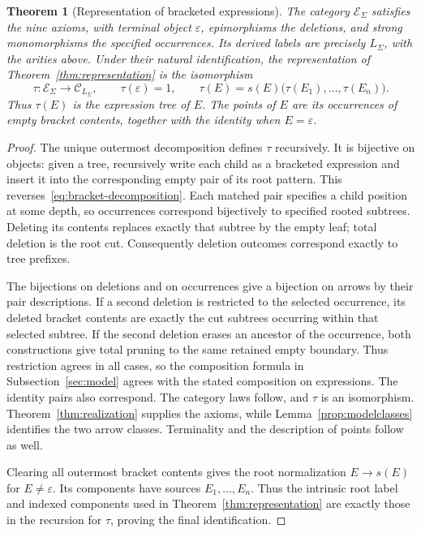 \documentclass[11pt,a4paper]{article}
\theoremstyle{plain}
\newtheorem{theorem}{Theorem}[section]
\theoremstyle{definition}
\theoremstyle{remark}
\newcommand{\C}{\mathcal C}
\begin{document}
\begin{theorem}[Representation of bracketed expressions]\label{prop:bracketed}
The category $\mathcal E_\Sigma$ satisfies the nine axioms, with
terminal object $\varepsilon$, epimorphisms the deletions, and strong
monomorphisms the specified occurrences. Its derived labels are
precisely $L_\Sigma$, with the arities above. Under their natural
identification, the representation of Theorem~\ref{thm:representation}
is the isomorphism
\[
 \tau:\mathcal E_\Sigma\longrightarrow\C_{L_\Sigma},
 \qquad
 \tau(\varepsilon)=1,\qquad
 \tau(E)=s(E)\bigl(\tau(E_1),\ldots,\tau(E_n)\bigr).
\]
Thus $\tau(E)$ is the expression tree of $E$. The points of $E$ are
its occurrences of empty bracket contents, together with the identity
when $E=\varepsilon$.
\end{theorem}
\begin{proof}
The unique outermost decomposition defines $\tau$ recursively. It is
bijective on objects: given a tree, recursively write each child as a
bracketed expression and insert it into the corresponding empty pair
of its root pattern. This reverses~\eqref{eq:bracket-decomposition}.
Each matched pair specifies a child position at some depth, so
occurrences correspond bijectively to specified rooted subtrees.
Deleting its contents replaces exactly that subtree by the empty leaf;
total deletion is the root cut. Consequently deletion outcomes
correspond exactly to tree prefixes.

The bijections on deletions and on occurrences give a bijection on
arrows by their pair descriptions. If a second deletion is restricted
to the selected occurrence, its deleted bracket contents are exactly
the cut subtrees occurring within that selected subtree. If the
second deletion erases an ancestor of the occurrence, both
constructions give total pruning to the same retained empty boundary.
Thus restriction agrees in all cases, so the composition formula in
Subsection~\ref{sec:model} agrees with the stated composition on
expressions. The identity pairs also correspond. The category laws follow,
and $\tau$ is an isomorphism. Theorem~\ref{thm:realization} supplies
the axioms, while Lemma~\ref{prop:modelclasses} identifies the
two arrow classes. Terminality and the description of points follow
as well.

Clearing all outermost bracket contents gives the root normalization
$E\to s(E)$ for $E\ne\varepsilon$. Its components have sources
$E_1,\ldots,E_n$. Thus the intrinsic root label and indexed components
used in Theorem~\ref{thm:representation} are exactly those in the
recursion for $\tau$, proving the final identification.
\end{proof}
\end{document}

